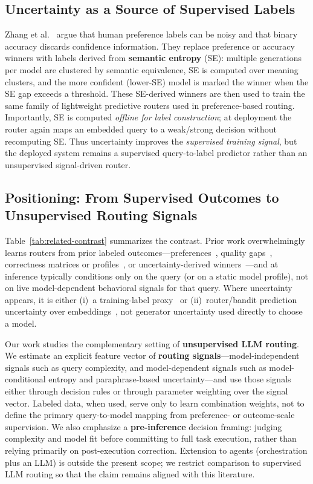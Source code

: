 \subsection{Uncertainty as a Source of Supervised Labels}

Zhang et al.~\cite{zhang2025uncertainty} argue that human preference labels can be noisy and that binary accuracy discards confidence information.
They replace preference or accuracy winners with labels derived from \textbf{semantic entropy} (SE): multiple generations per model are clustered by semantic equivalence, SE is computed over meaning clusters, and the more confident (lower-SE) model is marked the winner when the SE gap exceeds a threshold.
These SE-derived winners are then used to train the same family of lightweight predictive routers used in preference-based routing.
Importantly, SE is computed \emph{offline for label construction}; at deployment the router again maps an embedded query to a weak/strong decision without recomputing SE.
Thus uncertainty improves the \emph{supervised training signal}, but the deployed system remains a supervised query-to-label predictor rather than an unsupervised signal-driven router.

\subsection{Positioning: From Supervised Outcomes to Unsupervised Routing Signals}

Table~\ref{tab:related-contrast} summarizes the contrast.
Prior work overwhelmingly learns routers from prior labeled outcomes---preferences~\cite{ong2025routellm}, quality gaps~\cite{ding2024hybrid}, correctness matrices or profiles~\cite{song2025irt,wang2025mixllm,wang2025icl}, or uncertainty-derived winners~\cite{zhang2025uncertainty}---and at inference typically conditions only on the query (or on a static model profile), not on live model-dependent behavioral signals for that query.
Where uncertainty appears, it is either (i)~a training-label proxy~\cite{zhang2025uncertainty} or (ii)~router/bandit prediction uncertainty over embeddings~\cite{wang2025mixllm}, not generator uncertainty used directly to choose a model.

Our work studies the complementary setting of \textbf{unsupervised LLM routing}.
We estimate an explicit feature vector of \textbf{routing signals}---model-independent signals such as query complexity, and model-dependent signals such as model-conditional entropy and paraphrase-based uncertainty---and use those signals either through decision rules or through parameter weighting over the signal vector.
Labeled data, when used, serve only to learn combination weights, not to define the primary query-to-model mapping from preference- or outcome-scale supervision.
We also emphasize a \textbf{pre-inference} decision framing: judging complexity and model fit before committing to full task execution, rather than relying primarily on post-execution correction.
Extension to agents (orchestration plus an LLM) is outside the present scope; we restrict comparison to supervised LLM routing so that the claim remains aligned with this literature.

